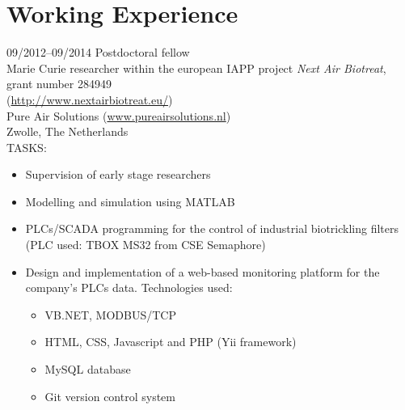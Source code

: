 \documentclass[a4paper]{article}
\begin{document}
\pagebreak

\section{Working Experience}
\begin{CV}
\item[09/2012--09/2014] Postdoctoral fellow\\
Marie Curie researcher within the european IAPP project \emph{Next Air Biotreat}, grant number 284949 \\ 
(\url{http://www.nextairbiotreat.eu/})\\
Pure Air Solutions (\url{www.pureairsolutions.nl})\\
Zwolle, The Netherlands
\vspace{0.4cm}\\TASKS:\vspace{0.2cm}
\begin{itemize}
\item Supervision of early stage researchers
\item Modelling and simulation using MATLAB 
\item PLCs/SCADA programming for the control of industrial biotrickling filters (PLC used: TBOX MS32 from CSE Semaphore)
\item Design and implementation of a web-based monitoring platform for the company's PLCs data. Technologies used:
\begin{itemize}
\item VB.NET, MODBUS/TCP 
\item HTML, CSS, Javascript and PHP (Yii framework)
\item MySQL database 
\item Git version control system
\end{itemize}
\end{itemize}



\end{CV}
\end{document}
